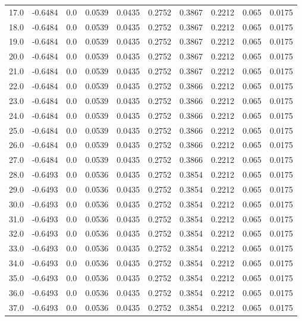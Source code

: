 \begin{longtable}{lrrrrrrrrr}
17.0 & -0.6484 & 0.0 & 0.0539 & 0.0435 & 0.2752 & 0.3867 & 0.2212 & 0.065 & 0.0175 \\
18.0 & -0.6484 & 0.0 & 0.0539 & 0.0435 & 0.2752 & 0.3867 & 0.2212 & 0.065 & 0.0175 \\
19.0 & -0.6484 & 0.0 & 0.0539 & 0.0435 & 0.2752 & 0.3867 & 0.2212 & 0.065 & 0.0175 \\
20.0 & -0.6484 & 0.0 & 0.0539 & 0.0435 & 0.2752 & 0.3867 & 0.2212 & 0.065 & 0.0175 \\
21.0 & -0.6484 & 0.0 & 0.0539 & 0.0435 & 0.2752 & 0.3867 & 0.2212 & 0.065 & 0.0175 \\
22.0 & -0.6484 & 0.0 & 0.0539 & 0.0435 & 0.2752 & 0.3866 & 0.2212 & 0.065 & 0.0175 \\
23.0 & -0.6484 & 0.0 & 0.0539 & 0.0435 & 0.2752 & 0.3866 & 0.2212 & 0.065 & 0.0175 \\
24.0 & -0.6484 & 0.0 & 0.0539 & 0.0435 & 0.2752 & 0.3866 & 0.2212 & 0.065 & 0.0175 \\
25.0 & -0.6484 & 0.0 & 0.0539 & 0.0435 & 0.2752 & 0.3866 & 0.2212 & 0.065 & 0.0175 \\
26.0 & -0.6484 & 0.0 & 0.0539 & 0.0435 & 0.2752 & 0.3866 & 0.2212 & 0.065 & 0.0175 \\
27.0 & -0.6484 & 0.0 & 0.0539 & 0.0435 & 0.2752 & 0.3866 & 0.2212 & 0.065 & 0.0175 \\
28.0 & -0.6493 & 0.0 & 0.0536 & 0.0435 & 0.2752 & 0.3854 & 0.2212 & 0.065 & 0.0175 \\
29.0 & -0.6493 & 0.0 & 0.0536 & 0.0435 & 0.2752 & 0.3854 & 0.2212 & 0.065 & 0.0175 \\
30.0 & -0.6493 & 0.0 & 0.0536 & 0.0435 & 0.2752 & 0.3854 & 0.2212 & 0.065 & 0.0175 \\
31.0 & -0.6493 & 0.0 & 0.0536 & 0.0435 & 0.2752 & 0.3854 & 0.2212 & 0.065 & 0.0175 \\
32.0 & -0.6493 & 0.0 & 0.0536 & 0.0435 & 0.2752 & 0.3854 & 0.2212 & 0.065 & 0.0175 \\
33.0 & -0.6493 & 0.0 & 0.0536 & 0.0435 & 0.2752 & 0.3854 & 0.2212 & 0.065 & 0.0175 \\
34.0 & -0.6493 & 0.0 & 0.0536 & 0.0435 & 0.2752 & 0.3854 & 0.2212 & 0.065 & 0.0175 \\
35.0 & -0.6493 & 0.0 & 0.0536 & 0.0435 & 0.2752 & 0.3854 & 0.2212 & 0.065 & 0.0175 \\
36.0 & -0.6493 & 0.0 & 0.0536 & 0.0435 & 0.2752 & 0.3854 & 0.2212 & 0.065 & 0.0175 \\
37.0 & -0.6493 & 0.0 & 0.0536 & 0.0435 & 0.2752 & 0.3854 & 0.2212 & 0.065 & 0.0175 \\

\end{longtable}
